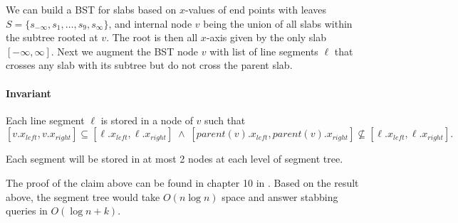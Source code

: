 We can build a BST for slabs based on $x$-values of end points with leaves $S = \{s_{-\infty},s_1, \dots, s_9, s_{\infty} \}$, and internal node $v$ being the union of all slabs within the subtree rooted at $v$. 
%
The root is then all $x$-axis given by the only slab $[-\infty, \infty]$.
%
Next we augment the BST node $v$ with list of line segments $\ell$ that crosses any slab with its subtree but do not cross the parent slab. 
%
\paragraph{Invariant} Each line segment $\ell$ is stored in a node of $v$ such that 
\[ [v.x_{left}, v.x_{right}] \subseteq [ \ell.x_{left}, \ell.x_{right}]   \; \wedge \; [parent(v).x_{left}, parent(v).x_{right}] \not \subseteq [\ell.x_{left}, \ell.x_{right}].   \]

\begin{claim}
Each segment will be stored in at most 2 nodes at each level of segment tree.
\end{claim} 

The proof of the claim above can be found in chapter 10 in \cite{Berg:2008}. Based on the result above, the segment tree would take $O(n \log n)$ space and answer stabbing queries in $O(\log n + k)$.
